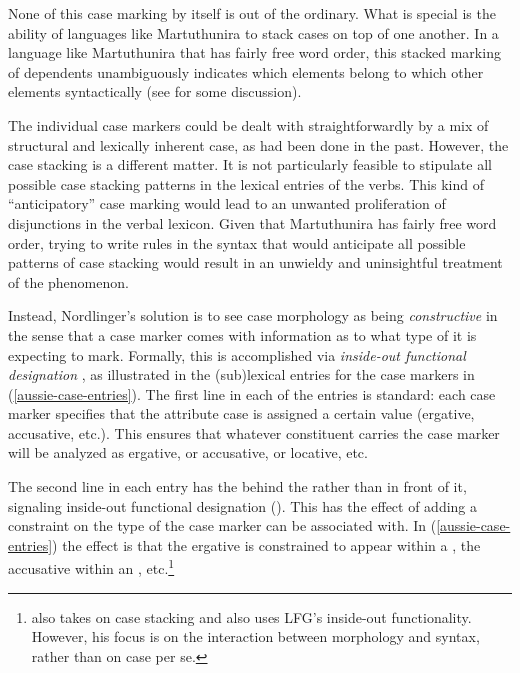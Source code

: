 \documentclass[output=paper,hidelinks]{langscibook}
\begin{document}
None of this case marking by itself is out of the ordinary. What is special is the ability
of languages like   Martuthunira to stack  cases on top of one another.  In a
language like Martuthunira that  has  fairly free word order, this stacked
marking of dependents unambiguously indicates  which elements belong to which
other elements syntactically (see \citealt{butt2000} for some discussion). 

The individual case markers could be dealt with straightforwardly by a mix of
structural and lexically inherent case, as had been done in the past.  However,
the case stacking is a different matter.  It is not particularly feasible to
stipulate all possible case stacking patterns in the lexical entries of the
verbs.  This kind of ``anticipatory'' case marking would lead to an unwanted proliferation
of disjunctions in the verbal lexicon.
Given that Martuthunira  has  fairly free word order, trying to write rules
in the syntax that would anticipate all possible patterns of case stacking would
result in an   unwieldy and uninsightful treatment of the phenomenon. 


Instead, 
Nordlinger's solution is to see case morphology as being {\em constructive} in
the sense that a case marker comes with information as to what type of {\GF}
it is expecting to mark.  Formally, this is accomplished via {\em inside-out
  functional designation} \citep{dalrymple1993,dalrymple01}, as illustrated in
  the (sub)lexical entries for the case markers in (\ref{aussie-case-entries}).  The first
  line in each of the entries is standard:  each case
marker specifies that the attribute {\sc case} is assigned a certain
value (ergative, accusative, etc.).  This ensures that whatever
constituent carries the case marker will be analyzed as ergative, or
accusative, or locative, etc. 

The second line in each entry has the \UP behind the {\GF} rather than in front of
it, signaling inside-out functional designation (). This has the effect of
adding a constraint on the type of {\GF} the case marker can be associated with.
In (\ref{aussie-case-entries}) the effect is that the ergative is constrained
to appear within a \SUBJ, the accusative within an \OBJ,
etc.\footnote{\citet{Andrews1996} also takes on case stacking and also uses LFG's
  inside-out functionality. However, his focus is on the interaction between
  morphology and syntax, rather than on case per se.} 
\end{document}
